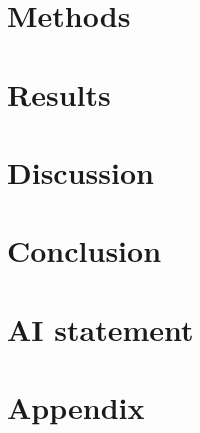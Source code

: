 \documentclass[11pt]{article}
\begin{document}
\newpage
\section{Methods}


\newpage
\section{Results}


\newpage
\section{Discussion}


\section{Conclusion}



\section{AI statement}


\newpage


\newpage
\section{Appendix}
\appendix
\renewcommand{\thefigure}{\Alph{section}\arabic{figure}}
\renewcommand{\thetable}{\Alph{section}\arabic{table}}
\setcounter{figure}{0}
\setcounter{table}{0}

\end{document}
